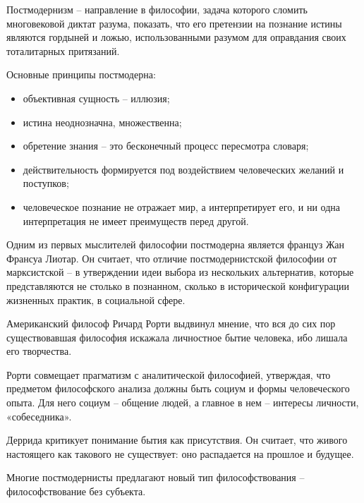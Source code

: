 Постмодернизм -- направление в философии, задача которого сломить многовековой диктат разума, показать, что его претензии на познание истины являются гордыней и ложью, использованными разумом для оправдания своих тоталитарных притязаний.

Основные принципы постмодерна:
\begin{itemize}
	\item объективная сущность – иллюзия;
	\item истина неоднозначна, множественна;
	\item обретение знания – это бесконечный процесс пересмотра словаря;
	\item действительность формируется под воздействием человеческих желаний и поступков;
	\item человеческое познание не отражает мир, а интерпретирует его, и ни одна интерпретация не имеет преимуществ перед другой.
\end{itemize}

Одним из первых мыслителей философии постмодерна является француз Жан Франсуа Лиотар. Он считает, что отличие постмодернистской философии от марксистской – в утверждении идеи выбора из нескольких альтернатив, которые представляются не столько в познанном, сколько в исторической конфигурации жизненных практик, в социальной сфере.

Американский философ Ричард Рорти выдвинул мнение, что вся до сих пор существовавшая философия искажала личностное бытие человека, ибо лишала его творчества.

Рорти совмещает прагматизм с аналитической философией, утверждая, что предметом философского анализа должны быть социум и формы человеческого опыта. Для него социум – общение людей, а главное в нем – интересы личности, «собеседника».

Деррида критикует понимание бытия как присутствия. Он считает, что живого настоящего как такового не существует: оно распадается на прошлое и будущее.

Многие постмодернисты предлагают новый тип философствования – философствование без субъекта.